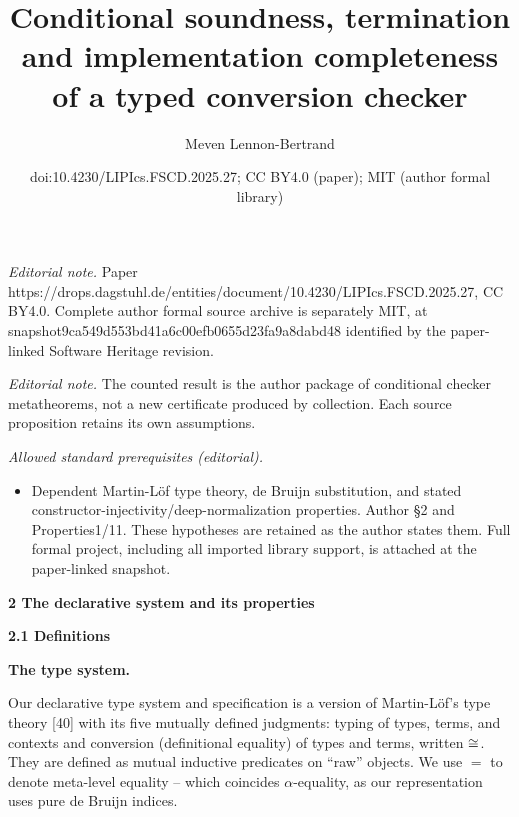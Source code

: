 \documentclass[10pt,a4paper]{amsart}
\title{Conditional soundness, termination and implementation completeness of a typed conversion checker}
\author{Meven Lennon-Bertrand}
\date{doi:10.4230/LIPIcs.FSCD.2025.27; CC BY4.0 (paper); MIT (author formal library)}
\begin{document}
\maketitle
\noindent\textit{Editorial note.} Paper https://drops.dagstuhl.de/entities/document/10.4230/LIPIcs.FSCD.2025.27, CC BY4.0. Complete author formal source archive is separately MIT, at snapshot9ca549d553bd41a6c00efb0655d23fa9a8dabd48 identified by the paper-linked Software Heritage revision.\par\medskip
\noindent\textit{Editorial note.} The counted result is the author package of conditional checker metatheorems, not a new certificate produced by collection. Each source proposition retains its own assumptions.\par\medskip
\noindent\textit{Allowed standard prerequisites (editorial).}\begin{itemize}
\item Dependent Martin-Löf type theory, de Bruijn substitution, and stated constructor-injectivity/deep-normalization properties. Author §2 and Properties1/11. These hypotheses are retained as the author states them. Full formal project, including all imported library support, is attached at the paper-linked snapshot.
\end{itemize}\medskip
 
\par\medskip\noindent\textbf{2 The declarative system and its properties}\par
 
 
\par\medskip\noindent\textbf{2.1 Definitions}\par
 
 
\par\medskip\noindent\textbf{The type system.}\par
 
 
Our declarative type system and specification is a version of Martin-Löf’s type theory [40] with its five mutually defined judgments: typing of types, terms, and contexts and conversion (definitional equality) of types and terms, written $\mathrel{\raisebox{-0.5pt}{$\cong$}}$. They are defined as mutual inductive predicates on “raw” objects. We use $=$ to denote meta-level equality – which coincides $\alpha$-equality, as our representation uses pure de Bruijn indices.\par
 
\end{document}
